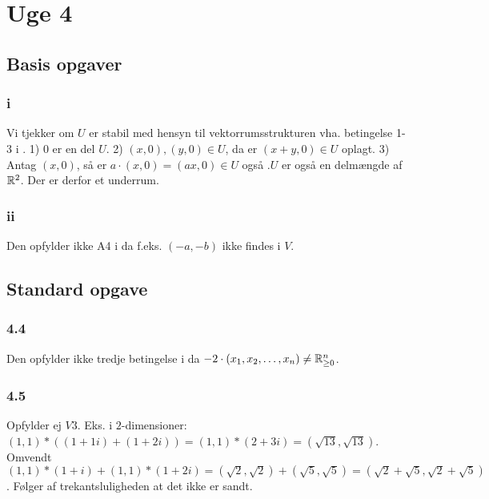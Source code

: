 
\chapter{Uge 4}

	\section{Basis opgaver}

		\subsection{i}

			Vi tjekker om $U$ er stabil med hensyn til vektorrumsstrukturen vha. betingelse 1-3 i \cite[Definition 4.1.4]{hesselholt2017}. 1) $0$ er en del $U$. 2) $(x,0),(y,0)\in U$, da er $(x+y,0)\in U$ oplagt. 3) Antag $(x,0)$, så er $a\cdot (x,0)=(ax,0)\in U$ også .$U$ er også en delmængde af $\mathbb{R}^2$. Der er derfor et underrum.

		\subsection{ii}

			Den opfylder ikke A4 i \cite[Definition 4.1.4]{hesselholt2017} da f.eks. $(-a,-b)$ ikke findes i $V$.

	\section{Standard opgave}

		\subsection{4.4}

			Den opfylder ikke tredje betingelse i \cite[Definition 4.1.4]{hesselholt2017} da $-2\cdot (x_1,x_2,\ldots,x_n)\neq \mathbb{R}^n_{\geq 0}$.

		\subsection{4.5}

			Opfylder ej $V3$. Eks. i $2$-dimensioner: $(1,1)*((1+1i)+(1+2i))=(1,1)*(2+3i)=(\sqrt{13},\sqrt{13})$. Omvendt $(1,1)*(1+i)+(1,1)*(1+2i)=(\sqrt{2},\sqrt{2})+(\sqrt{5},\sqrt{5})=(\sqrt{2}+\sqrt{5},\sqrt{2}+\sqrt{5})$. Følger af trekantsluligheden at det ikke er sandt.

